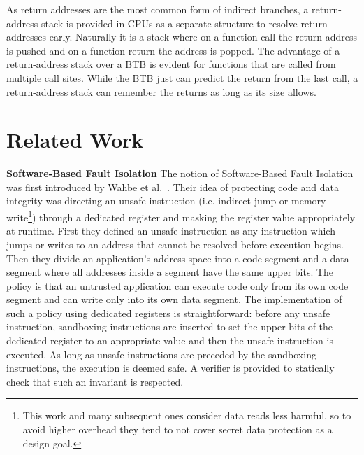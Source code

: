 \documentclass[conference]{IEEEtran}
\begin{document}
As return addresses are the most common form of indirect branches, a return-address stack \cite{webbSubroutine} is provided in CPUs as a separate structure to resolve return addresses early. Naturally it is a stack where on a function call the return address is pushed and on a function return the address is popped. The advantage of a return-address stack  over a BTB is evident  for functions that are called from multiple call sites. While the BTB just can predict the return from the  last call, a return-address stack can remember the returns as long as its size allows.


\section{Related Work}
\label{related}
\textbf{Software-Based Fault Isolation}
The notion of Software-Based Fault Isolation was first  introduced by Wahbe et al.~\cite{wahbeSFI}. Their idea of protecting code and data integrity was directing an unsafe instruction 
(i.e. indirect jump or memory write\footnote{This work and many subsequent ones consider data reads less harmful, so to avoid higher overhead
they tend to not cover secret data protection as a design goal.}) through a dedicated register and masking the register value appropriately 	 at  runtime. First they defined an unsafe
instruction as any instruction which jumps or writes to an address that cannot be resolved before execution begins. Then they divide  an application's address 
space into a code segment and a data segment where all addresses inside a segment have the same upper bits. The policy is that an untrusted application can  
execute  code only from its own code segment and  can write only into its own data segment. The implementation of such a policy using dedicated registers is straightforward: before any unsafe instruction, sandboxing  instructions are inserted to set the upper bits of the dedicated register to an appropriate  value and then the unsafe instruction
 is executed. As long as unsafe instructions are preceded by the sandboxing instructions, the execution is deemed safe. A verifier is provided to statically check that such an invariant is respected.
\end{document}
